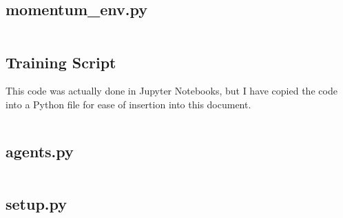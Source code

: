 \inputminted[breaklines, tabsize=2, fontsize=\footnotesize]{py}{Code/menu.py}

\clearpage

\subsection{momentum\_env.py}

\inputminted[breaklines, tabsize=2, fontsize=\footnotesize]{py}{Code/training/momentum_env/momentum_env.py}

\clearpage

\subsection{Training Script}
This code was actually done in Jupyter Notebooks, but I have copied the code into a Python file for ease of insertion into this document.

\vs

\inputminted[breaklines, tabsize=2, fontsize=\footnotesize]{py}{Code/training_script.py}

\clearpage

\subsection{agents.py}

\clearpage

\inputminted[breaklines, tabsize=2, fontsize=\footnotesize]{py}{Code/agents.py}

\clearpage

\subsection{setup.py}

\inputminted[breaklines, tabsize=2, fontsize=\footnotesize, fontsize=\footnotesize]{py}{Code/setup.py}